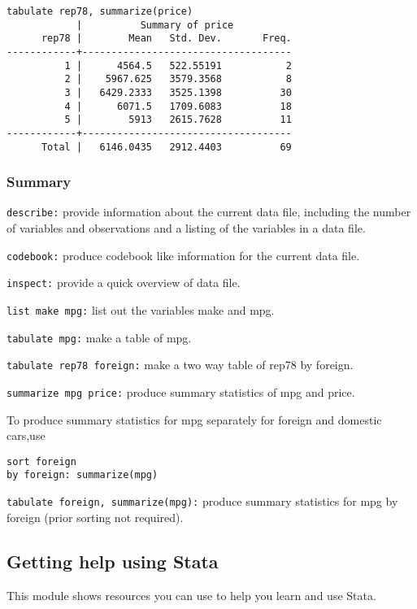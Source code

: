 \begin{lstlisting}
tabulate rep78, summarize(price)
            |          Summary of price
      rep78 |        Mean   Std. Dev.       Freq.
------------+------------------------------------
          1 |      4564.5   522.55191           2
          2 |    5967.625   3579.3568           8
          3 |   6429.2333   3525.1398          30
          4 |      6071.5   1709.6083          18
          5 |        5913   2615.7628          11
------------+------------------------------------
      Total |   6146.0435   2912.4403          69
\end{lstlisting}

\subsubsection{Summary}


\begin{compactitem}
\item \lstinline{describe:} provide information about the current data file, including the number of variables and observations and a listing of the variables in a data file.

\item \lstinline{codebook:} produce codebook like information for the current data file.
\item \lstinline{inspect:} provide a quick overview of data file.
\item \lstinline{list make mpg:} list out the variables make and mpg.
\item \lstinline{tabulate mpg:} make a table of mpg.
\item \lstinline{tabulate rep78 foreign:} make a two way table of rep78 by foreign.
\item \lstinline{summarize mpg price:} produce summary statistics of mpg and price.
\item To produce summary statistics for mpg separately for foreign and domestic cars,use
\begin{lstlisting}
sort foreign
by foreign: summarize(mpg)
\end{lstlisting}
\item \lstinline{tabulate foreign, summarize(mpg):} produce summary statistics for mpg by foreign (prior sorting not required).
\end{compactitem}

\subsection{Getting help using Stata}
This module shows resources you can use to help you learn and use Stata.

